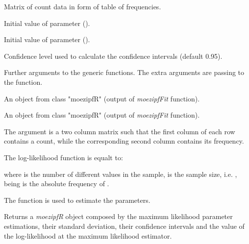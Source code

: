 \documentclass[letterpaper]{book}
\begin{document}
\begin{Arguments}
\begin{ldescription}
\item[\code{data}] Matrix of count data in form of table of frequencies.

\item[\code{init\_alpha}] Initial value of \eqn{\alpha}{} parameter ().

\item[\code{init\_beta}] Initial value of \eqn{\beta}{} parameter ().

\item[\code{level}] Confidence level used to calculate the confidence intervals (default 0.95).

\item[\code{...}] Further arguments to the generic functions. The extra arguments are passing to the \emph{} function.

\item[\code{object}] An object from class "moezipfR" (output of \emph{moezipfFit} function).

\item[\code{x}] An object from class "moezipfR" (output of \emph{moezipfFit} function).
\end{ldescription}
\end{Arguments}
%
\begin{Details}\relax
The argument  is a two column matrix such that the first column of each row contains a
count, while the corresponding second column contains its frequency.

The log-likelihood function is equalt to:

where  is the number of different values in the sample,  is the sample size,
i.e.  ,  being  is the absolute
frequency of .

The function \emph{} is used to estimate the parameters.
\end{Details}
%
\begin{Value}
Returns a \emph{moezipfR} object composed by the maximum likelihood parameter estimations,
their standard deviation, their confidence intervals and the value of the log-likelihood at the
maximum likelihood estimator.
\end{Value}
\end{document}
